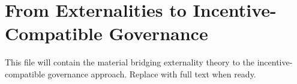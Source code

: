 \section{From Externalities to Incentive-Compatible Governance}


This file will contain the material bridging externality theory to the incentive-compatible governance approach. Replace with full text when ready.